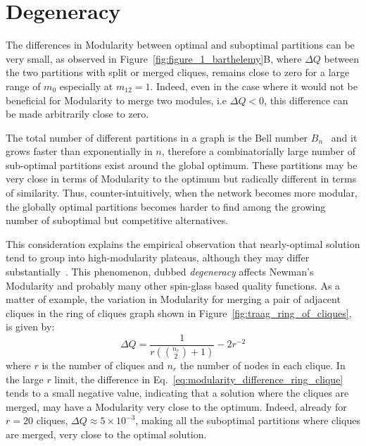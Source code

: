 \section{Degeneracy}\label{sec:degeneracy}
The differences in Modularity between optimal and suboptimal partitions can be very small, as observed in Figure~\ref{fig:figure_1_barthelemy}B, where $\Delta Q$ between the two partitions with split or merged cliques, remains close to zero for a large range of $m_0$ especially at $m_{12}=1$.
Indeed, even in the case where it would not be beneficial for Modularity to merge two modules, i.e $\Delta Q <0$, this difference can be made arbitrarily close to zero.

The total number of different partitions in a graph is the Bell number $B_n$~\cite{stanley1997} and it grows faster than exponentially in $n$, therefore a combinatorially large number of sub-optimal partitions exist around the global optimum. These partitions may be very close in terms of Modularity to the optimum but radically different in terms of similarity.
Thus, counter-intuitively, when the network becomes more modular, the globally optimal partitions becomes harder to find among the growing number of suboptimal but competitive alternatives.

This consideration explains the empirical observation that nearly-optimal solution tend to group into high-modularity plateaus, although they may differ substantially~\cite{good2009}. This phenomenon, dubbed \emph{degeneracy} affects Newman's Modularity and probably many other spin-glass based quality functions.
As a matter of example, the variation in Modularity for merging a pair of adjacent cliques in the ring of cliques graph shown in Figure~\ref{fig:traag_ring_of_cliques}, is given by:
\begin{equation}\label{eq:modularity_difference_ring_clique}
\Delta Q = \frac{1}{r\left(\binom{n_r}{2}+1\right)}-2r^{-2}
\end{equation}
where $r$ is the number of cliques and $n_r$ the number of nodes in each clique.
In the large $r$ limit, the difference in Eq.~\ref{eq:modularity_difference_ring_clique} tends to a small negative value, indicating that a solution where the cliques are merged, may have a Modularity very close to the optimum.
Indeed, already for $r=20$ cliques, $\Delta Q \approx 5\times 10^{-3}$, making all the suboptimal partitions where cliques are merged, very close to the optimal solution.

